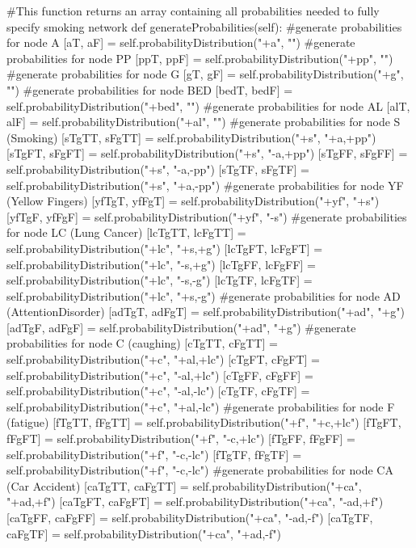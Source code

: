 \documentclass[10pt]{article}
\begin{document}
\begin{spverbatim}
    #This function returns an array containing all probabilities needed to fully specify smoking network
    def generateProbabilities(self):
        #generate probabilities for node A
        [aT,  aF] = self.probabilityDistribution("+a", "")
        #generate probabilities for node PP
        [ppT,  ppF] = self.probabilityDistribution("+pp", "")
        #generate probabilities for node G
        [gT,  gF] = self.probabilityDistribution("+g", "")
        #generate probabilities for node BED
        [bedT,  bedF] = self.probabilityDistribution("+bed", "")
        #generate probabilities for node AL
        [alT,  alF] = self.probabilityDistribution("+al", "")
        #generate probabilities for node S (Smoking)
        [sTgTT, sFgTT] = self.probabilityDistribution("+s", "+a,+pp")
        [sTgFT, sFgFT] = self.probabilityDistribution("+s", "-a,+pp")
        [sTgFF, sFgFF] = self.probabilityDistribution("+s", "-a,-pp")
        [sTgTF, sFgTF] = self.probabilityDistribution("+s", "+a,-pp")
        #generate probabilities for node YF (Yellow Fingers)
        [yfTgT, yfFgT] = self.probabilityDistribution("+yf", "+s")
        [yfTgF, yfFgF] = self.probabilityDistribution("+yf", "-s")
        #generate probabilities for node LC (Lung Cancer)
        [lcTgTT, lcFgTT] = self.probabilityDistribution("+lc", "+s,+g")
        [lcTgFT, lcFgFT] = self.probabilityDistribution("+lc", "-s,+g")
        [lcTgFF, lcFgFF] = self.probabilityDistribution("+lc", "-s,-g")
        [lcTgTF, lcFgTF] = self.probabilityDistribution("+lc", "+s,-g")
        #generate probabilities for node AD (AttentionDisorder)
        [adTgT, adFgT] = self.probabilityDistribution("+ad", "+g")
        [adTgF, adFgF] = self.probabilityDistribution("+ad", "+g")
        #generate probabilities for node C (caughing)
        [cTgTT, cFgTT] = self.probabilityDistribution("+c", "+al,+lc")
        [cTgFT, cFgFT] = self.probabilityDistribution("+c", "-al,+lc")
        [cTgFF, cFgFF] = self.probabilityDistribution("+c", "-al,-lc")
        [cTgTF, cFgTF] = self.probabilityDistribution("+c", "+al,-lc")
        #generate probabilities for node F (fatigue)
        [fTgTT, fFgTT] = self.probabilityDistribution("+f", "+c,+lc")
        [fTgFT, fFgFT] = self.probabilityDistribution("+f", "-c,+lc")
        [fTgFF, fFgFF] = self.probabilityDistribution("+f", "-c,-lc")
        [fTgTF, fFgTF] = self.probabilityDistribution("+f", "-c,-lc")
        #generate probabilities for node CA (Car Accident)
        [caTgTT, caFgTT] = self.probabilityDistribution("+ca", "+ad,+f")
        [caTgFT, caFgFT] = self.probabilityDistribution("+ca", "-ad,+f")
        [caTgFF, caFgFF] = self.probabilityDistribution("+ca", "-ad,-f")
        [caTgTF, caFgTF] = self.probabilityDistribution("+ca", "+ad,-f")
        

\end{spverbatim}
\end{document}
